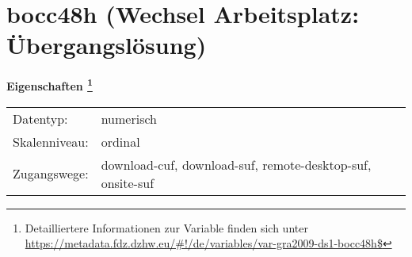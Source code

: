 
    \setcounter{footnote}{0}

    \vspace*{-1.8cm}
	\section{bocc48h (Wechsel Arbeitsplatz: Übergangslösung)}
	\label{section:bocc48h}



    \vspace*{0.5cm}
    \noindent\textbf{Eigenschaften
	\footnote{Detailliertere Informationen zur Variable finden sich unter
		\url{https://metadata.fdz.dzhw.eu/\#!/de/variables/var-gra2009-ds1-bocc48h$}}}\\
	\begin{tabularx}{\hsize}{@{}lX}
	Datentyp: & numerisch \\
	Skalenniveau: & ordinal \\
	Zugangswege: &
	  download-cuf, 
	  download-suf, 
	  remote-desktop-suf, 
	  onsite-suf
 \\
    \end{tabularx}



